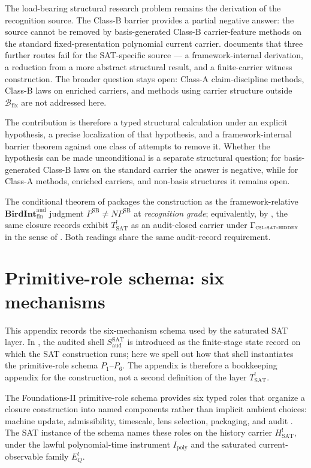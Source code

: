 \documentclass[11pt]{article}
\newcommand{\Tsat}{T^{!}_{\mathrm{SAT}}}
\newcommand{\Saud}{S_{\mathrm{aud}}^{\mathrm{SAT}}}
\newcommand{\Hsat}{H^{!}_{\mathrm{SAT}}}
\newcommand{\Ipoly}{I_{\mathrm{poly}}}
\newcommand{\EQbang}{E^{!}_{Q}}
\newcommand{\CSLSATHidden}{\Gamma_{\textsc{csl-sat-hidden}}}
\newcommand{\PSB}{P^{\mathrm{SB}}}
\newcommand{\NPSB}{NP^{\mathrm{SB}}}
\newcommand{\BirdInt}{\mathbf{BirdInt}^{\mathrm{aud}}_{\mathrm{fin}}}
\newcommand{\RecognitionGrade}{\emph{recognition grade}}
\theoremstyle{definition}
\begin{document}
The load-bearing structural research problem remains the derivation of
the recognition source.  The Class-B barrier provides a partial negative
answer: the source cannot be removed by basis-generated Class-B
carrier-feature methods on the standard fixed-presentation polynomial
current carrier.  \citet{TsiokosHiddenness2026} documents that three
further routes fail for the SAT-specific source — a framework-internal
derivation, a reduction from a more abstract structural result, and a
finite-carrier witness construction.  The broader question stays open:
Class-A claim-discipline methods, Class-B laws on enriched carriers,
and methods using carrier structure outside
\(\mathcal B_{\mathrm{fix}}\) are not addressed here.

The contribution is therefore a typed structural calculation under an
explicit hypothesis, a precise localization of that hypothesis, and a
framework-internal barrier theorem against one class of attempts to
remove it.  Whether the hypothesis can be made unconditional is a
separate structural question; for basis-generated Class-B laws on the
standard carrier the answer is negative, while for Class-A methods,
enriched carriers, and non-basis structures it remains open.

The conditional theorem of  packages the
construction as the framework-relative \(\BirdInt\) judgment
\(\PSB\neq\NPSB\) at \RecognitionGrade{}; equivalently, by
, the same closure records exhibit
\(\Tsat\) as an audit-closed carrier under \(\CSLSATHidden\) in the
sense of \citet{Tsiokos2026AOR}.  Both readings share the same
audit-record requirement.
 
\appendix


\section{Primitive-role schema: six mechanisms}
\label{app:primitive-roles}

This appendix records the six-mechanism schema used by the saturated
SAT layer.  In , the audited shell
\(\Saud\) is introduced as the finite-stage state record on which the
SAT construction runs; here we spell out how that shell instantiates
the primitive-role schema \(P_{1}\)--\(P_{6}\).  The appendix is
therefore a bookkeeping appendix for the construction, not a second
definition of the layer \(\Tsat\).

The Foundations-II primitive-role schema provides six typed roles that
organize a closure construction into named components rather than
implicit ambient choices: machine update, admissibility, timescale,
lens selection, packaging, and audit \citep{TsiokosFoundationsII2026}.
The SAT instance of the schema names these roles on the history
carrier \(\Hsat\), under the lawful polynomial-time instrument
\(\Ipoly\) and the saturated current-observable family \(\EQbang\).
\end{document}
